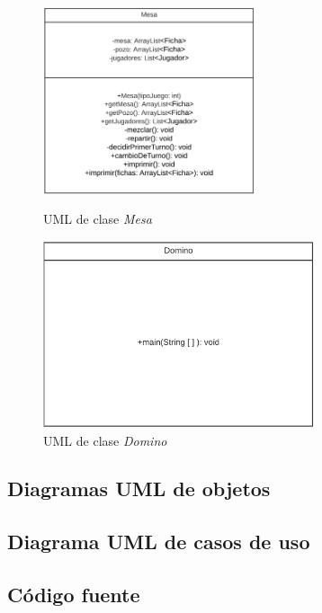 \documentclass[12pt]{article}
\newcommand{\linejump}{\hfill \break}
\begin{document}
  \begin{figure}[h!]
    \centering
    \begin{minipage}[l]{0.45\textwidth}
      \centering
      \includegraphics[height=5.5cm]{uml5.png}
      \caption{UML de clase \textit{Mesa}}
    \end{minipage}
    \begin{minipage}[r]{0.45\textwidth}
      \centering
      \includegraphics[height=5.5cm]{uml6.png}
      \caption{UML de clase \textit{Domino}} 
    \end{minipage}
  \end{figure}

  \linejump

  \subsection{Diagramas UML de objetos}


  \subsection{Diagrama UML de casos de uso}


  \subsection{Código fuente}
\end{document}
